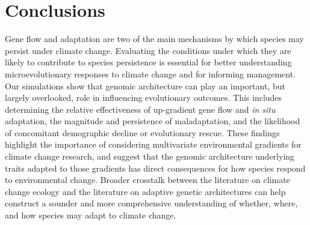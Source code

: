 \documentclass[9pt,twocolumn,twoside,lineno]{new_article}
\begin{document}
\section*{Conclusions}
Gene flow and adaptation are two of the main mechanisms by which species may persist under climate change. Evaluating the conditions under which they are likely to contribute to species persistence is essential for better understanding 
microevolutionary responses to climate change and for informing management. Our simulations show that 
genomic architecture can play an important, but largely overlooked, role in influencing evolutionary outcomes.
This includes determining the relative effectiveness
of up-gradient gene flow and \textit{in situ} adaptation,
the magnitude and persistence
of maladaptation,
and the likelihood of concomitant demographic decline
or evolutionary rescue.
These findings highlight the importance of considering multivariate environmental gradients
for climate change research, and suggest that the genomic architecture underlying traits
adapted to those gradients has direct consequences for how species respond to environmental change.
Broader crosstalk between the literature on climate change ecology
and the literature on adaptive genetic architectures can help
construct a sounder and more comprehensive understanding of
whether, where, and how species may adapt to climate change.



\showacknow{} %


\end{document}
